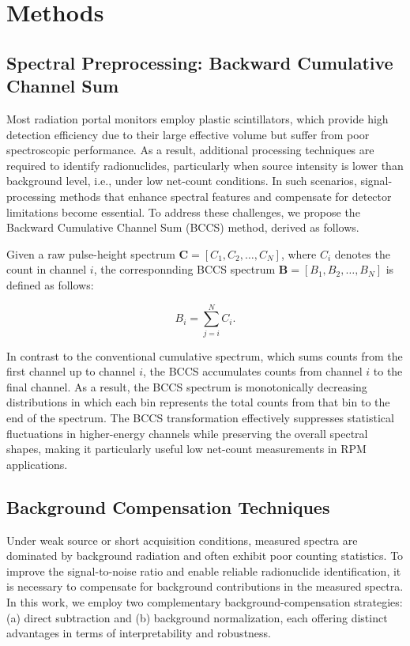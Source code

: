 \documentclass[10pt]{wlscirep}
\begin{document}
\section*{Methods}

\subsection*{Spectral Preprocessing: Backward Cumulative Channel Sum}

Most radiation portal monitors employ plastic scintillators, which provide high detection efficiency due to their large effective volume but suffer from poor spectroscopic performance. As a result, additional processing techniques are required to identify radionuclides, particularly when source intensity is lower than background level, i.e., under low net-count conditions. In such scenarios, signal-processing methods that enhance spectral features and compensate for detector limitations become essential. To address these challenges, we propose the Backward Cumulative Channel Sum (BCCS) method, derived as follows.

Given a raw pulse-height spectrum $\mathbf{C} = [C_1, C_2, \ldots, C_N]$, where $C_i$ denotes the count in channel $i$, the corresponnding BCCS spectrum $\mathbf{B} = [B_1, B_2, \ldots , B_N]$ is defined as follows: 

\begin{equation}
B_i = \sum_{j=i}^N C_i.
\end{equation}

In contrast to the conventional cumulative spectrum, which sums counts from the first channel up to channel $i$, the BCCS accumulates counts from channel $i$ to the final channel. As a result, the BCCS spectrum is monotonically decreasing distributions in which each bin represents the total counts from that bin to the end of the spectrum. The BCCS transformation effectively suppresses statistical fluctuations in higher-energy channels while preserving the overall spectral shapes, making it particularly useful low net-count measurements in RPM applications. 

\subsection*{Background Compensation Techniques}

Under weak source or short acquisition conditions, measured spectra are dominated by background radiation and often exhibit poor counting statistics. To improve the signal-to-noise ratio and enable reliable radionuclide identification, it is necessary to compensate for background contributions in the measured spectra. In this work, we employ two complementary background-compensation strategies: (a) direct subtraction and (b) background normalization, each offering distinct advantages in terms of interpretability and robustness.
\end{document}
